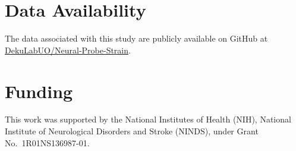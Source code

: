 \documentclass[fleqn,10pt]{wlscirep}
\begin{document}
\section*{Data Availability }

The data associated with this study are publicly available on GitHub at
\href{https://github.com/DekuLabUO/Neural-Probe-Strain}{DekuLabUO/Neural-Probe-Strain}.

\section*{Funding}

This work was supported by the National Institutes of Health (NIH), National Institute of Neurological Disorders and Stroke (NINDS), under Grant No.~1R01NS136987-01.

\end{document}
